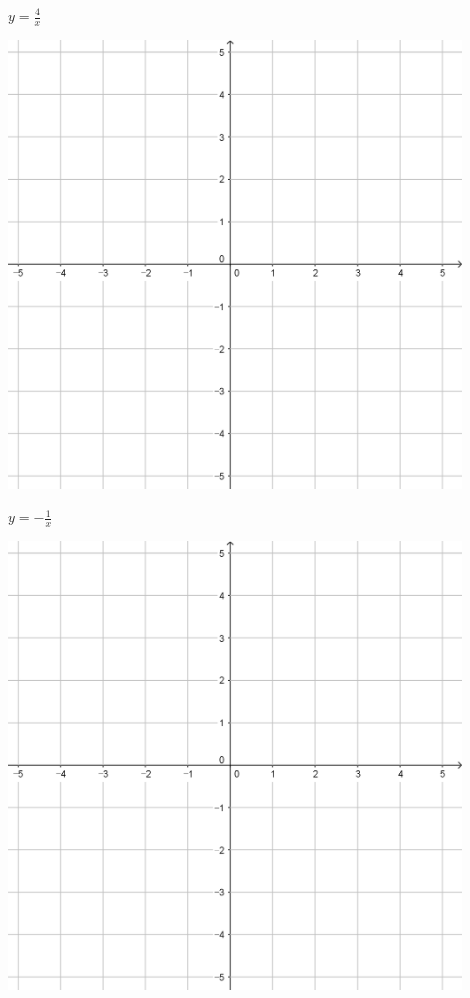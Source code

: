 \documentclass[a4paper]{oblivoir}
\begin{document}
\begin{minipage}{0.45\textwidth}\centering
\(y=\frac4x\)
\par\bigskip\includegraphics[width=0.9\textwidth]{55}
\end{minipage}
\begin{minipage}{0.45\textwidth}\centering
\(y=-\frac1{x}\)
\par\bigskip\includegraphics[width=0.9\textwidth]{55}
\end{minipage}\bigskip\bigskip\par
\end{document}
